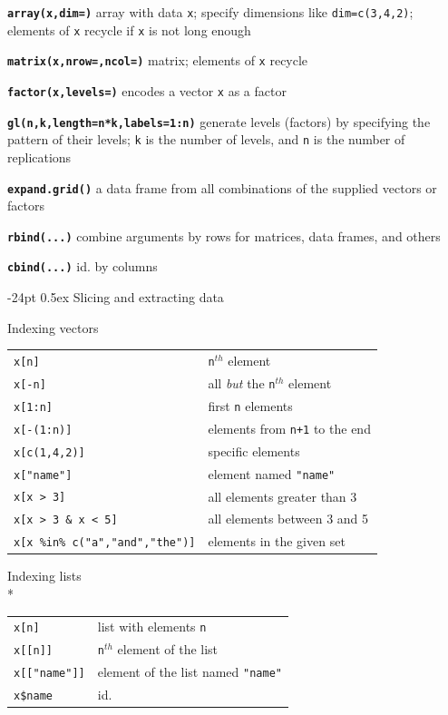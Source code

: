\documentclass[10pt,landscape]{article}
\makeatletter
\renewcommand\section{\@startsection{section}{1}{0mm}%
                                     {-24pt}%
                                     {0.5ex}%
                                {\color{blue}\normalfont\large\bfseries}}
\newcommand{\code}{\texttt}
\newcommand{\bcode}[1]{\texttt{\textbf{#1}}}
\makeatother
\begin{document}
\begin{multicols}{3}
\bcode{array(x,dim=)} array with data \code{x}; specify
dimensions like \code{dim=c(3,4,2)}; elements of \code{x} recycle if \code{x}
is not long enough

\bcode{matrix(x,nrow=,ncol=)} matrix; elements of \code{x} recycle

\bcode{factor(x,levels=)} encodes a vector \code{x} as a factor

\bcode{gl(n,k,length=n*k,labels=1:n)} generate levels (factors) by specifying
the pattern of their levels; \code{k} is the number of levels, and \code{n} is the
number of replications

\bcode{expand.grid()} a data frame from all combinations of the supplied vectors
     or factors

\bcode{rbind(...)} combine arguments by rows for matrices, data frames, and
others

\bcode{cbind(...)} id. by columns





\section{Slicing and extracting data}

Indexing vectors

\begin{tabular}{@{}l@{\ }l}
\code{x[n]} & \code{n}$^{th}$ element\\
\code{x[-n]} & all \emph{but} the \code{n}$^{th}$ element\\
\code{x[1:n]} & first \code{n} elements\\
\code{x[-(1:n)]} & elements from \code{n+1} to the end\\
\code{x[c(1,4,2)]} & specific elements\\
\code{x["name"]} & element named \code{"name"}\\
\code{x[x > 3]} & all elements greater than 3\\
\code{x[x > 3 \& x < 5]} & all elements between 3 and 5\\
\code{x[x \%in\% c("a","and","the")]} & elements in the given set\\
\end{tabular}

Indexing lists\\*
\samepage\begin{tabular}{@{}l@{\ }l}
\code{x[n]} & list with elements \code{n}\\
\code{x[[n]]} & \code{n}$^{th}$ element of the list\\
\code{x[["name"]]} & element of the list named \code{"name"}\\
\code{x\$name} & id.\\
\end{tabular}


\end{multicols}
\end{document}
